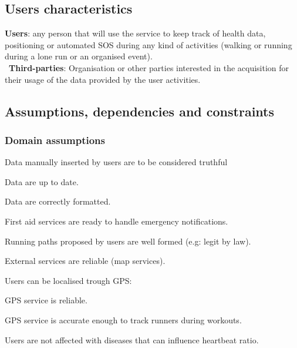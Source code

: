 \documentclass{article}
\begin{document}
\subsection{Users characteristics}
\textbf{Users}: any person that will use the service to keep track of health data, positioning or automated SOS during any kind of activities (walking or running during a lone run or an organised event).\\\
\textbf{Third-parties}: Organisation or other parties interested in the acquisition for their usage of the data provided by the user activities.

\subsection{Assumptions, dependencies and constraints}

\subsubsection{Domain assumptions}

\begin{enumerate}[label={[D\arabic*]}]
    	\item Data manually inserted by users are to be considered 
    	truthful   
    	\begin{enumerate}[label={[D\arabic{enumi}.\arabic*]}]
    			\item Data are up to date.
    			\item Data are correctly formatted.
  		\end{enumerate}

    	\item First aid services are ready to handle emergency notifications.  		
  		\item Running paths proposed by users are well formed (e.g: legit by law).
  		\item External services are reliable (map services).
  		\item Users can be localised trough GPS:
  		\begin{enumerate}[label={[D\arabic{enumi}.\arabic*]}]
    			\item GPS service is reliable.
    			\item GPS service is accurate enough to track runners during workouts.
  		\end{enumerate}
  		\item Users are not affected with diseases that can influence heartbeat ratio.
  		
\end{enumerate}
\end{document}

